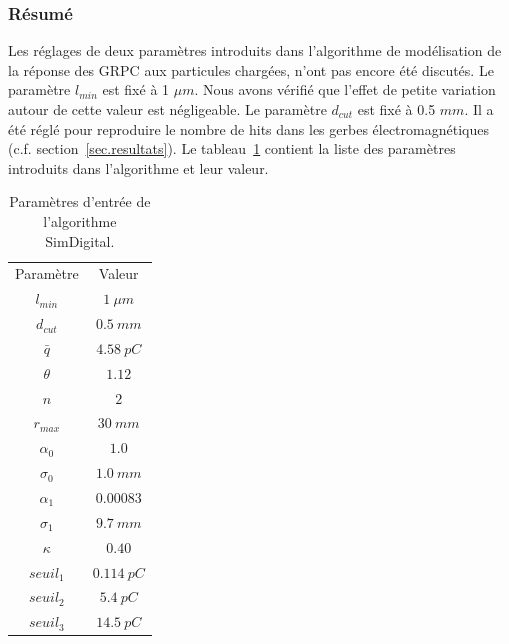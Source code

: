 \subsubsection{Résumé}
Les réglages de deux paramètres introduits dans l'algorithme de modélisation de la réponse des GRPC aux particules chargées, n'ont pas encore été discutés. Le paramètre $l_{min}$ est fixé à 1 $\mu m$. Nous avons vérifié que l'effet de petite variation autour de cette valeur est négligeable. Le paramètre $d_{cut}$ est fixé à 0.5 $mm$. Il a été réglé pour reproduire le nombre de hits dans les gerbes électromagnétiques (c.f. section~\ref{sec.resultats}). Le tableau~\ref{tab.summary} contient la liste des paramètres introduits dans l'algorithme et leur valeur.
\begin{table}[!ht]
  \begin{center}
    \begin{tabular}{c|c}
      \rowcolor{black!20!white}Paramètre & Valeur \\
      \rowcolor{black!5!white}\hline
      \rowcolor{black!5!white}$l_{min}$ & $1\ \mu m$\\
      \rowcolor{black!5!white}$d_{cut}$ & $0.5\ mm$ \\
      \rowcolor{black!5!white}\hline
      \rowcolor{black!5!white}$\bar q$ & $4.58\ pC$ \\
      \rowcolor{black!5!white}$\theta$ & $1.12$ \\ 
      \rowcolor{black!5!white}\hline
      \rowcolor{black!5!white}$n$ & $2$ \\ 
      \rowcolor{black!5!white}$r_{max}$ & $30\ mm$ \\
      \rowcolor{black!5!white}$\alpha_0$ & $1.0$ \\
      \rowcolor{black!5!white}$\sigma_0$ & $1.0\ mm$ \\
      \rowcolor{black!5!white}$\alpha_1$ & $0.00083$ \\
      \rowcolor{black!5!white}$\sigma_1$ & $9.7\ mm$ \\
      \rowcolor{black!5!white}\hline
      \rowcolor{black!5!white}$\kappa$ & $0.40$\\
      \rowcolor{black!5!white}\hline 
      \rowcolor{black!5!white}$seuil_1$ & $0.114\ pC$\\
      \rowcolor{black!5!white}$seuil_2$ & $5.4\ pC$\\
      \rowcolor{black!5!white}$seuil_3$ & $14.5\ pC$
    \end{tabular}
  \end{center}  
  \caption{Paramètres d'entrée de l'algorithme SimDigital.}
  \label{tab.summary}
\end{table}

